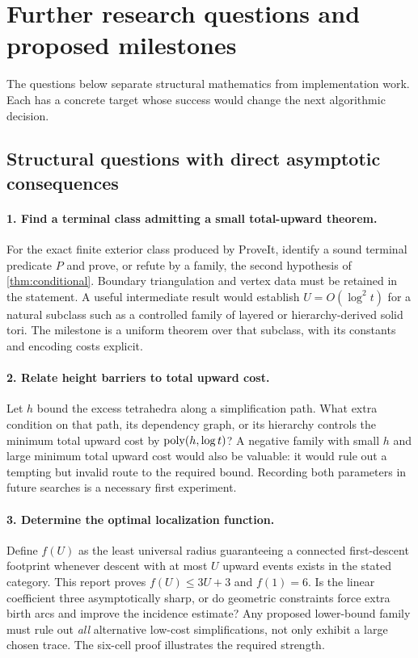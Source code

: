 \section{Further research questions and proposed milestones}\label{sec:questions}

The questions below separate structural mathematics from implementation
work. Each has a concrete target whose success would change the next
algorithmic decision.

\subsection{Structural questions with direct asymptotic consequences}

\paragraph{1. Find a terminal class admitting a small total-upward theorem.}
For the exact finite exterior class produced by ProveIt, identify a sound
terminal predicate $P$ and prove, or refute by a family, the second
hypothesis of \cref{thm:conditional}. Boundary triangulation and vertex data
must be retained in the statement. A useful intermediate result would
establish $U=O(\log^2 t)$ for a natural subclass such as a controlled family
of layered or hierarchy-derived solid tori. The milestone is a uniform
theorem over that subclass, with its constants and encoding costs explicit.

\paragraph{2. Relate height barriers to total upward cost.}
Let $h$ bound the excess tetrahedra along a simplification path. What extra
condition on that path, its dependency graph, or its hierarchy controls
the minimum total upward cost by $\operatorname{poly}(h,\log t)$? A negative family with
small $h$ and large minimum total upward cost would also be valuable: it
would rule out a tempting but invalid route to the required bound. Recording
both parameters in future searches is a necessary first experiment.

\paragraph{3. Determine the optimal localization function.}
Define $f(U)$ as the least universal radius guaranteeing a connected
first-descent footprint whenever descent with at most $U$ upward events
exists in the stated category. This report proves $f(U)\le3U+3$ and
$f(1)=6$. Is the linear coefficient three asymptotically sharp, or do
geometric constraints force extra birth arcs and improve the incidence
estimate? Any proposed lower-bound family must rule out \emph{all}
alternative low-cost simplifications, not only exhibit a large chosen
trace. The six-cell proof illustrates the required strength.

